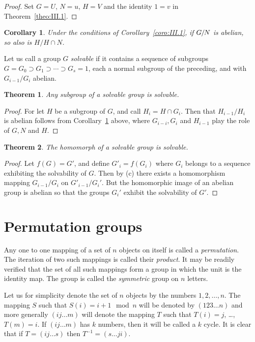 \documentclass[10pt,leqno,a5paper]{book}
\newtheorem{theo}{Theorem}
\newtheorem{coro}{Corollary}
\theoremstyle{definition}
\let\htw\section
\begin{document}
\begin{proof}
Set $G = U$, $N = u$, $H = V$ and the identity $1 = v$ in Theorem~\ref{theo:III.1}.
\end{proof}


\begin{coro}
\label{coro:III.2}
Under the conditions of Corollary~\ref{coro:III.1}, if $G\mkern-1mu/\mkern-2mu N$ is abelian, so also is $H/H \cap N$.
\end{coro}


Let us call a group $G$ \emph{solvable} if it contains a sequence of subgroups $G = G_0 \supset G_1 \supset \cdots \supset G_s = 1$, each a normal subgroup of the preceding, and with $G_{i-1}/G_i$ abelian.


\begin{theo}
\label{theo:III.2}
Any subgroup of a solvable group is solvable.
\end{theo}

\begin{proof}
For let $H$ be a subgroup of $G$, and call $H_i = H \cap G_i$.
Then that $H_{i-1}/H_i$ is abelian follows from Corollary~\ref{coro:III.2} above, where $G_{i-i}, G_i$ and $H_{i-1}$ play the role of $G, N$ and $H$.
\end{proof}


\begin{theo}
\label{theo:III.3}
The homomorph of a solvable group is solvable.
\end{theo}

\begin{proof}
Let $f(G) = G'$, and define $G'_i = f(G_i)$ where $G_i$ belongs to a sequence exhibiting the solvability of $G$.
Then by (c) there exists a homomorphism mapping $G_{i-1}/G_i$ on $G'_{i-1} / G_i'$.
But the homomorphic image of an abelian group is abelian so that the groups $G_i'$ exhibit the solvability of $G'$.
\end{proof}


\htw{Permutation groups}

Any one to one mapping of a set of $n$ objects on itself is called a \emph{permutation}.
The iteration of two such mappings is called their \emph{product}.
It may be readily verified that the set of all such mappings form a group in which the unit is the identity map.
The group is called the \emph{symmetric} group on $n$ letters.

Let us for simplicity denote the set of $n$ objects by the numbers $1,2,\ldots,n$.
The mapping $S$ such that $S(i) = i+1 \mod n$ will be denoted by $(123 \ldots n)$ and more generally $(ij\ldots m)$ will denote the mapping $T$ such that $T(i) = j$, \ldots, $T(m) = i$.
If $(ij\ldots m)$ has $k$ numbers, then it will be called a $k$ cycle.
It is clear that if $T = (ij\ldots s)$ then $T^{-1} = (s \ldots ji)$.
\end{document}
